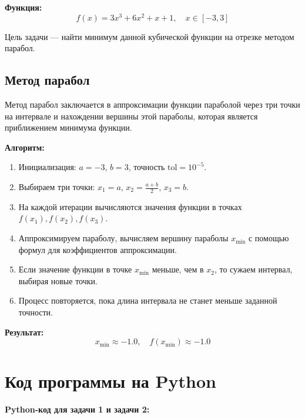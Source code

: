 \documentclass[a4paper,12pt]{article}
\begin{document}
\textbf{Функция:}
\[
f(x) = 3x^3 + 6x^2 + x + 1, \quad x \in [-3, 3]
\]

Цель задачи — найти минимум данной кубической функции на отрезке методом парабол.

\subsection{Метод парабол}

Метод парабол заключается в аппроксимации функции параболой через три точки на интервале и нахождении вершины этой параболы, которая является приближением минимума функции.

\textbf{Алгоритм:}
\begin{enumerate}
    \item Инициализация: \( a = -3 \), \( b = 3 \), точность \( \text{tol} = 10^{-5} \).
    \item Выбираем три точки: \( x_1 = a \), \( x_2 = \frac{a + b}{2} \), \( x_3 = b \).
    \item На каждой итерации вычисляются значения функции в точках \( f(x_1), f(x_2), f(x_3) \).
    \item Аппроксимируем параболу, вычисляем вершину параболы \( x_{\text{min}} \) с помощью формул для коэффициентов аппроксимации.
    \item Если значение функции в точке \( x_{\text{min}} \) меньше, чем в \( x_2 \), то сужаем интервал, выбирая новые точки.
    \item Процесс повторяется, пока длина интервала не станет меньше заданной точности.
\end{enumerate}

\textbf{Результат:}
\[
x_{\text{min}} \approx -1.0, \quad f(x_{\text{min}}) \approx -1.0
\]

\section{Код программы на Python}

\textbf{Python-код для задачи 1 и задачи 2:}
\end{document}
